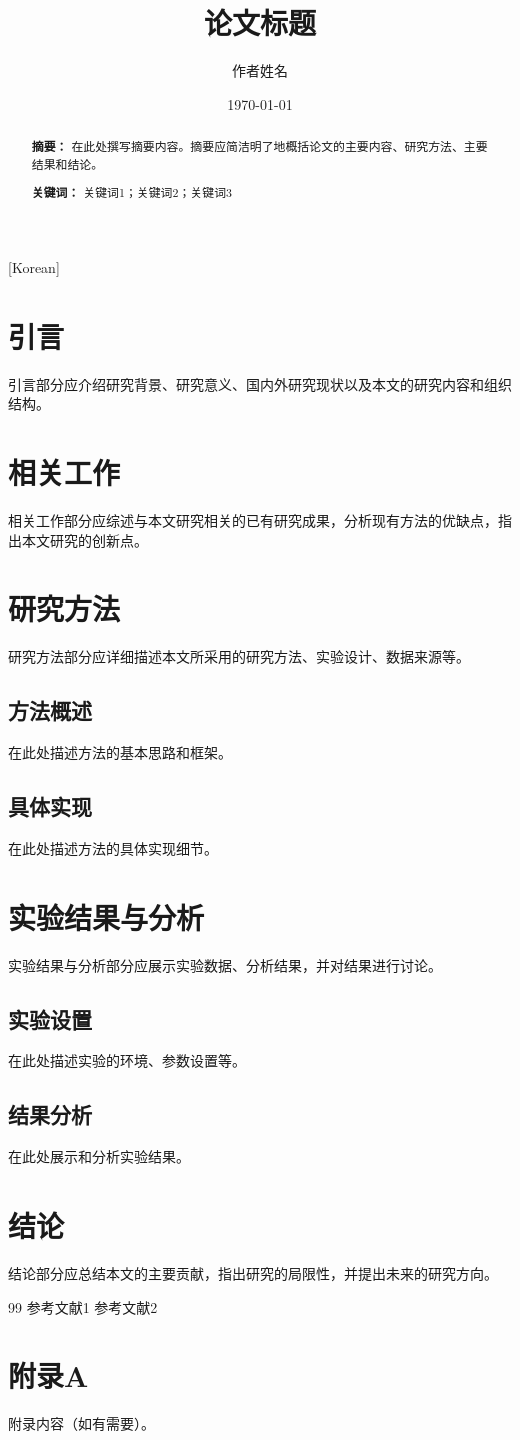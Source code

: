 [Korean] \documentclass[12pt,a4paper]{article}
\title{论文标题}
\author{作者姓名}
\date{\today}
\begin{document}
\maketitle

\begin{abstract}
\textbf{摘要：} 在此处撰写摘要内容。摘要应简洁明了地概括论文的主要内容、研究方法、主要结果和结论。

\textbf{关键词：} 关键词1；关键词2；关键词3
\end{abstract}

\tableofcontents
\newpage

\section{引言}
引言部分应介绍研究背景、研究意义、国内外研究现状以及本文的研究内容和组织结构。

\section{相关工作}
相关工作部分应综述与本文研究相关的已有研究成果，分析现有方法的优缺点，指出本文研究的创新点。

\section{研究方法}
研究方法部分应详细描述本文所采用的研究方法、实验设计、数据来源等。

\subsection{方法概述}
在此处描述方法的基本思路和框架。

\subsection{具体实现}
在此处描述方法的具体实现细节。

\section{实验结果与分析}
实验结果与分析部分应展示实验数据、分析结果，并对结果进行讨论。

\subsection{实验设置}
在此处描述实验的环境、参数设置等。

\subsection{结果分析}
在此处展示和分析实验结果。

\section{结论}
结论部分应总结本文的主要贡献，指出研究的局限性，并提出未来的研究方向。

\begin{thebibliography}{99}
 参考文献1
 参考文献2
\end{thebibliography}

\appendix
\section{附录A}
附录内容（如有需要）。
\end{document}

